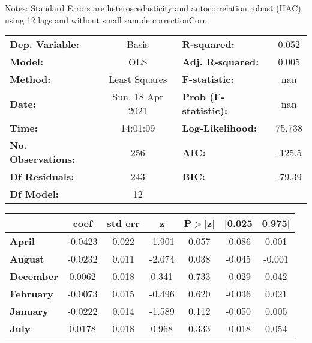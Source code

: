Notes: \newline
 [1] Standard Errors are heteroscedasticity and autocorrelation robust (HAC) using 12 lags and without small sample correctionCorn\begin{center}
\begin{tabular}{lclc}
\toprule
\textbf{Dep. Variable:}    &      Basis       & \textbf{  R-squared:         } &     0.052   \\
\textbf{Model:}            &       OLS        & \textbf{  Adj. R-squared:    } &     0.005   \\
\textbf{Method:}           &  Least Squares   & \textbf{  F-statistic:       } &       nan   \\
\textbf{Date:}             & Sun, 18 Apr 2021 & \textbf{  Prob (F-statistic):} &      nan    \\
\textbf{Time:}             &     14:01:09     & \textbf{  Log-Likelihood:    } &    75.738   \\
\textbf{No. Observations:} &         256      & \textbf{  AIC:               } &    -125.5   \\
\textbf{Df Residuals:}     &         243      & \textbf{  BIC:               } &    -79.39   \\
\textbf{Df Model:}         &          12      & \textbf{                     } &             \\
\bottomrule
\end{tabular}
\begin{tabular}{lcccccc}
                   & \textbf{coef} & \textbf{std err} & \textbf{z} & \textbf{P$> |$z$|$} & \textbf{[0.025} & \textbf{0.975]}  \\
\midrule
\textbf{April}     &      -0.0423  &        0.022     &    -1.901  &         0.057        &       -0.086    &        0.001     \\
\textbf{August}    &      -0.0232  &        0.011     &    -2.074  &         0.038        &       -0.045    &       -0.001     \\
\textbf{December}  &       0.0062  &        0.018     &     0.341  &         0.733        &       -0.029    &        0.042     \\
\textbf{February}  &      -0.0073  &        0.015     &    -0.496  &         0.620        &       -0.036    &        0.021     \\
\textbf{January}   &      -0.0222  &        0.014     &    -1.589  &         0.112        &       -0.050    &        0.005     \\
\textbf{July}      &       0.0178  &        0.018     &     0.968  &         0.333        &       -0.018    &        0.054     \\

\end{tabular}
\end{center}
